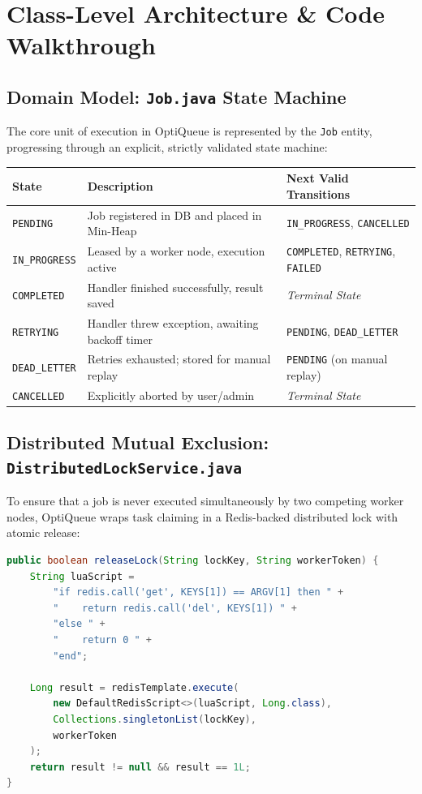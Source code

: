\documentclass[11pt,a4paper]{article}
\begin{document}
\newpage
\section{Class-Level Architecture \& Code Walkthrough}

\subsection{Domain Model: \texttt{Job.java} State Machine}
The core unit of execution in OptiQueue is represented by the \texttt{Job} entity, progressing through an explicit, strictly validated state machine:

\begin{center}
\begin{tabular}{lll}
\toprule
\textbf{State} & \textbf{Description} & \textbf{Next Valid Transitions} \\
\midrule
\texttt{PENDING} & Job registered in DB and placed in Min-Heap & \texttt{IN\_PROGRESS}, \texttt{CANCELLED} \\
\texttt{IN\_PROGRESS} & Leased by a worker node, execution active & \texttt{COMPLETED}, \texttt{RETRYING}, \texttt{FAILED} \\
\texttt{COMPLETED} & Handler finished successfully, result saved & \textit{Terminal State} \\
\texttt{RETRYING} & Handler threw exception, awaiting backoff timer & \texttt{PENDING}, \texttt{DEAD\_LETTER} \\
\texttt{DEAD\_LETTER} & Retries exhausted; stored for manual replay & \texttt{PENDING} (on manual replay) \\
\texttt{CANCELLED} & Explicitly aborted by user/admin & \textit{Terminal State} \\
\bottomrule
\end{tabular}
\end{center}

\subsection{Distributed Mutual Exclusion: \texttt{DistributedLockService.java}}
To ensure that a job is never executed simultaneously by two competing worker nodes, OptiQueue wraps task claiming in a Redis-backed distributed lock with atomic release:

\begin{lstlisting}[language=Java, caption={Atomic Distributed Lock Release via Lua}]
public boolean releaseLock(String lockKey, String workerToken) {
    String luaScript = 
        "if redis.call('get', KEYS[1]) == ARGV[1] then " +
        "    return redis.call('del', KEYS[1]) " +
        "else " +
        "    return 0 " +
        "end";
    
    Long result = redisTemplate.execute(
        new DefaultRedisScript<>(luaScript, Long.class),
        Collections.singletonList(lockKey),
        workerToken
    );
    return result != null && result == 1L;
}
\end{lstlisting}
\end{document}
